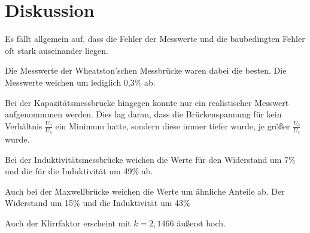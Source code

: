 \section{Diskussion}
\label{sec:Diskussion}
Es fällt allgemein auf, dass die Fehler der Messwerte und die baubedingten Fehler oft stark auseinander liegen.

Die Messwerte der Wheatston'schen Messbrücke waren dabei die besten. Die Messwerte weichen um lediglich 0,3\% ab.

Bei der Kapazitätsmessbrücke hingegen konnte nur ein realistischer Messwert aufgenommmen werden. Dies lag daran, dass die Brückenspannung für kein Verhältnis $\frac{U_3}{U_4}$
ein Minimum hatte, sondern diese immer tiefer wurde, je größer $\frac{U_3}{U_4}$ wurde.

Bei der Induktivitätsmessbrücke weichen die Werte für den Widerstand um 7\% und die für die Induktivität um 49\% ab.

Auch bei der Maxwellbrücke weichen die Werte um ähnliche Anteile ab. Der Widerstand um 15\% und die Induktivität um 43\%

Auch der Klirrfaktor erscheint mit $k = 2,1466$ äußerst hoch.